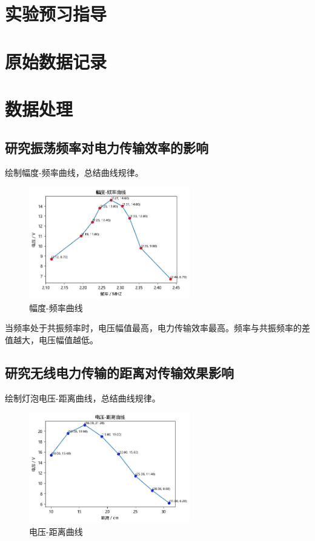 \documentclass[signature=data]{physicsreport}
\begin{document}
\maketitle

\section{实验预习指导}
\newpage

\section{原始数据记录}
\makeatletter
{}
\makeatother

\newpage

\section{数据处理}
\subsection{研究振荡频率对电力传输效率的影响}
绘制幅度-频率曲线，总结曲线规律。
\begin{figure}[htbp]
    \centering
    \includegraphics[width=7cm]{images/lab7/output.png}
    \caption{幅度-频率曲线}
\end{figure}

当频率处于共振频率时，电压幅值最高，电力传输效率最高。频率与共振频率的差值越大，电压幅值越低。

\subsection{研究无线电力传输的距离对传输效果影响}
绘制灯泡电压-距离曲线，总结曲线规律。
\begin{figure}[htbp]
    \centering
    \includegraphics[width=7cm]{images/lab7/output2.png}
    \caption{电压-距离曲线}
\end{figure}
\end{document}
